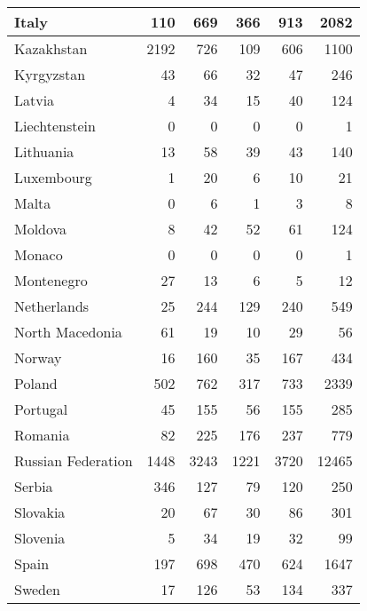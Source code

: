 \begin{table}
\begin{center}
\begin{tabular}{|l|r|r|r|r|r|}
                         Italy&   110&   669&   366&   913&  2082 \\\hline
                    Kazakhstan&  2192&   726&   109&   606&  1100 \\\hline
                    Kyrgyzstan&    43&    66&    32&    47&   246 \\\hline
                        Latvia&     4&    34&    15&    40&   124 \\\hline
                 Liechtenstein&     0&     0&     0&     0&     1 \\\hline
                     Lithuania&    13&    58&    39&    43&   140 \\\hline
                    Luxembourg&     1&    20&     6&    10&    21 \\\hline
                         Malta&     0&     6&     1&     3&     8 \\\hline
                       Moldova&     8&    42&    52&    61&   124 \\\hline
                        Monaco&     0&     0&     0&     0&     1 \\\hline
                    Montenegro&    27&    13&     6&     5&    12 \\\hline
                   Netherlands&    25&   244&   129&   240&   549 \\\hline
               North Macedonia&    61&    19&    10&    29&    56 \\\hline
                        Norway&    16&   160&    35&   167&   434 \\\hline
                        Poland&   502&   762&   317&   733&  2339 \\\hline
                      Portugal&    45&   155&    56&   155&   285 \\\hline
                       Romania&    82&   225&   176&   237&   779 \\\hline
            Russian Federation&  1448&  3243&  1221&  3720& 12465 \\\hline
                        Serbia&   346&   127&    79&   120&   250 \\\hline
                      Slovakia&    20&    67&    30&    86&   301 \\\hline
                      Slovenia&     5&    34&    19&    32&    99 \\\hline
                         Spain&   197&   698&   470&   624&  1647 \\\hline
                        Sweden&    17&   126&    53&   134&   337 \\\hline

\end{tabular}
\end{center}
\end{table}
